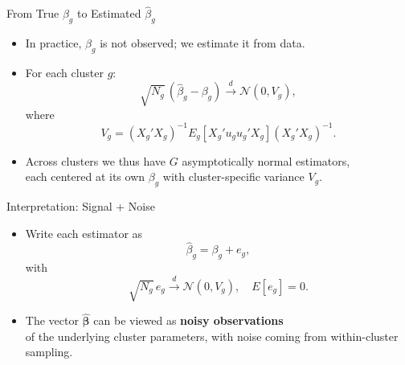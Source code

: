 \documentclass[
  ignorenonframetext,
]{beamer}
\providecommand{\tightlist}{%
  \setlength{\itemsep}{0pt}\setlength{\parskip}{0pt}}
\begin{document}
\begin{frame}{From True \(\beta_g\) to Estimated \(\hat{\beta}_g\)}
\label{from-true-beta_g-to-estimated-hatbeta_g}
\begin{itemize}
\tightlist
\item
  In practice, \(\beta_g\) is not observed; we estimate it from data.\\
\item
  For each cluster \(g\): \[
  \sqrt{N_g}\,(\hat{\beta}_g - \beta_g)
  \xrightarrow{d}
  \mathcal{N}(0, V_g),
  \] where \[
  V_g = (X_g'X_g)^{-1} E_g[X_g' u_g u_g' X_g] (X_g'X_g)^{-1}.
  \]
\item
  Across clusters we thus have \(G\) asymptotically normal estimators,\\
  each centered at its own \(\beta_g\) with cluster-specific variance
  \(V_g\).
\end{itemize}
\end{frame}

\begin{frame}{Interpretation: Signal + Noise}
\label{interpretation-signal-noise}
\begin{itemize}
\tightlist
\item
  Write each estimator as \[
  \hat{\beta}_g = \beta_g + e_g,
  \] with \[
  \sqrt{N_g}\, e_g \xrightarrow{d} \mathcal{N}(0, V_g),\quad E[e_g]=0.
  \]
\item
  The vector \(\hat{\boldsymbol{\beta}}\) can be viewed as \textbf{noisy
  observations}\\
  of the underlying cluster parameters, with noise coming from
  within-cluster sampling.
\end{itemize}
\end{frame}
\end{document}
